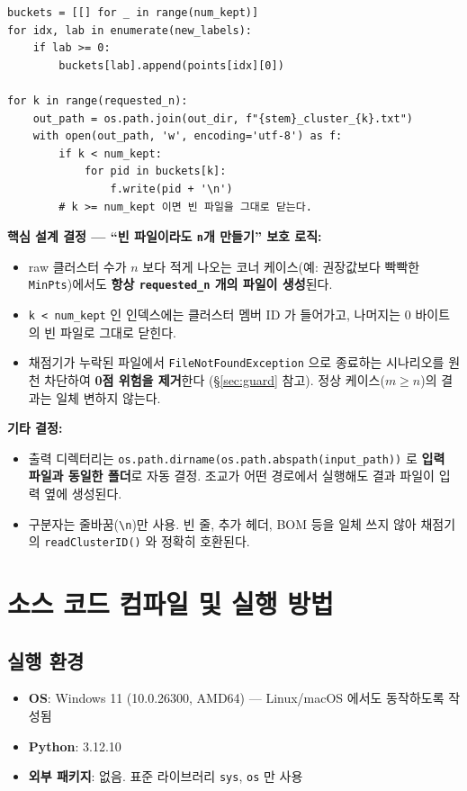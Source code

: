 \documentclass[12pt, a4paper]{article}
\begin{document}
\begin{verbatim}
buckets = [[] for _ in range(num_kept)]
for idx, lab in enumerate(new_labels):
    if lab >= 0:
        buckets[lab].append(points[idx][0])

for k in range(requested_n):
    out_path = os.path.join(out_dir, f"{stem}_cluster_{k}.txt")
    with open(out_path, 'w', encoding='utf-8') as f:
        if k < num_kept:
            for pid in buckets[k]:
                f.write(pid + '\n')
        # k >= num_kept 이면 빈 파일을 그대로 닫는다.
\end{verbatim}

\noindent\textbf{핵심 설계 결정 --- ``빈 파일이라도 \texttt{n}개 만들기'' 보호 로직:}
\begin{itemize}
    \item raw 클러스터 수가 $n$ 보다 적게 나오는 코너 케이스(예: 권장값보다 빡빡한 \texttt{MinPts})에서도 \textbf{항상 \texttt{requested\_n} 개의 파일이 생성}된다.
    \item \texttt{k < num\_kept} 인 인덱스에는 클러스터 멤버 ID 가 들어가고, 나머지는 0 바이트의 빈 파일로 그대로 닫힌다.
    \item 채점기가 누락된 파일에서 \texttt{FileNotFoundException} 으로 종료하는 시나리오를 원천 차단하여 \textbf{0점 위험을 제거}한다 (\S\ref{sec:guard} 참고). 정상 케이스($m \ge n$)의 결과는 일체 변하지 않는다.
\end{itemize}

\noindent\textbf{기타 결정:}
\begin{itemize}
    \item 출력 디렉터리는 \texttt{os.path.dirname(os.path.abspath(input\_path))} 로 \textbf{입력 파일과 동일한 폴더}로 자동 결정. 조교가 어떤 경로에서 실행해도 결과 파일이 입력 옆에 생성된다.
    \item 구분자는 줄바꿈(\texttt{\textbackslash n})만 사용. 빈 줄, 추가 헤더, BOM 등을 일체 쓰지 않아 채점기의 \texttt{readClusterID()} 와 정확히 호환된다.
\end{itemize}



\section{소스 코드 컴파일 및 실행 방법}

\subsection{실행 환경}
\begin{itemize}
    \item \textbf{OS}: Windows 11 (10.0.26300, AMD64) — Linux/macOS 에서도 동작하도록 작성됨
    \item \textbf{Python}: 3.12.10
    \item \textbf{외부 패키지}: 없음. 표준 라이브러리 \texttt{sys}, \texttt{os} 만 사용
\end{itemize}
\end{document}
